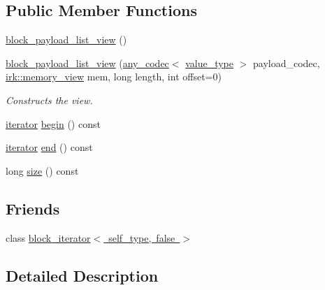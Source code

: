 \subsection*{Public Member Functions}
\begin{DoxyCompactItemize}
\item 
\mbox{\hyperlink{classirk_1_1index_1_1block__payload__list__view_a1e4549a450e5fa10e0be7e7f49258d32}{block\+\_\+payload\+\_\+list\+\_\+view}} ()
\item 
\mbox{\hyperlink{classirk_1_1index_1_1block__payload__list__view_ac4e12722967b36c60ef7eff0209f9ba5}{block\+\_\+payload\+\_\+list\+\_\+view}} (\mbox{\hyperlink{namespaceirk_a831a3a869cf19601dbfb5c41765a2e87}{any\+\_\+codec}}$<$ \mbox{\hyperlink{classirk_1_1index_1_1block__payload__list__view_a739d436330ba54972ef70a5cd3f57ef3}{value\+\_\+type}} $>$ payload\+\_\+codec, \mbox{\hyperlink{classirk_1_1memory__view}{irk\+::memory\+\_\+view}} mem, long length, int offset=0)
\begin{DoxyCompactList}\small\item\em Constructs the view. \end{DoxyCompactList}\item 
\mbox{\hyperlink{classirk_1_1index_1_1block__payload__list__view_a3cbb6ab331804c87e830be1380a3c2b2}{iterator}} \mbox{\hyperlink{classirk_1_1index_1_1block__payload__list__view_a32284b7ff4f4c6530a43b9148418348f}{begin}} () const
\item 
\mbox{\hyperlink{classirk_1_1index_1_1block__payload__list__view_a3cbb6ab331804c87e830be1380a3c2b2}{iterator}} \mbox{\hyperlink{classirk_1_1index_1_1block__payload__list__view_a0daeb1ce7d6b877d6345067956dd8c9e}{end}} () const
\item 
long \mbox{\hyperlink{classirk_1_1index_1_1block__payload__list__view_a39a195ac21c15a74c42c89f54dfbcbac}{size}} () const
\end{DoxyCompactItemize}
\subsection*{Friends}
\begin{DoxyCompactItemize}
\item 
class \mbox{\hyperlink{classirk_1_1index_1_1block__payload__list__view_a88a9a271d334c6a1ee36182f15227581}{block\+\_\+iterator$<$ self\+\_\+type, false $>$}}
\end{DoxyCompactItemize}


\subsection{Detailed Description}
